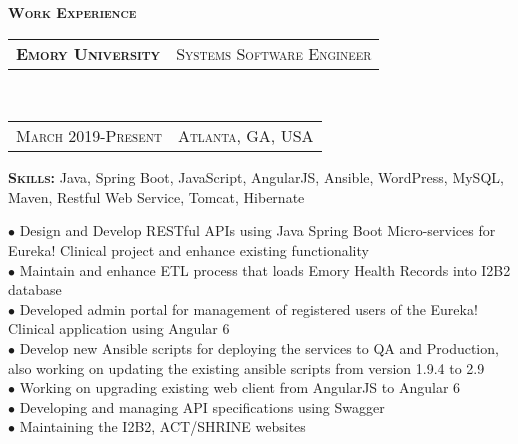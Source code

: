 \documentclass[10pt,a4paper,oneside]{article}
\begin{document}
    \begin{minipage}[t]{0.55\textwidth}
        \vspace{0pt}
        \textcolor{light-gray}{\textbf{\large W\textsc{ork} E\textsc{xperience}}}
        \vspace{10pt}\\
        \begin{tabular}{c|c}
            \textbf{\normalsize E\textsc{mory} U\textsc{niversity}}
            &\textmd{\normalsize S\textsc{ystems} S\textsc{oftware} E\textsc{ngineer}}
        \end{tabular}\\
        \textcolor{light-gray}{
            \begin{tabular}{c|c}
                {\small M\textsc{arch 2019}-P\textsc{resent}}
                &{\small A\textsc{tlanta}, G\textsc{A}, U\textsc{SA}}
            \end{tabular}
        }
        \vspace{2mm}
         \begin{adjustwidth}{7pt}{0pt}
            \textbf{S\textsc{kills: }} \small{Java, Spring Boot, JavaScript, AngularJS, Ansible, WordPress, MySQL, Maven, Restful Web Service, Tomcat, Hibernate}
        \end{adjustwidth}
        \vspace{1mm}
       \begin{adjustwidth}{7pt}{0pt}
            {\footnotesize $\bullet$ Design and Develop RESTful APIs using Java Spring Boot Micro-services for Eureka! Clinical project and enhance existing functionality\\
        $\bullet$ Maintain and enhance ETL process that loads Emory Health Records into I2B2 database\\
        $\bullet$ Developed admin portal for management of registered users of the Eureka! Clinical application using Angular 6\\
        $\bullet$ Develop new Ansible scripts for deploying the services to QA and Production, also working on updating the existing ansible scripts from version 1.9.4 to 2.9\\
        $\bullet$ Working on upgrading existing web client from AngularJS to Angular 6\\
        $\bullet$ Developing and managing API specifications using Swagger\\
        $\bullet$ Maintaining the I2B2, ACT/SHRINE websites\\
}
\end{adjustwidth}
\end{minipage}
\end{document}
